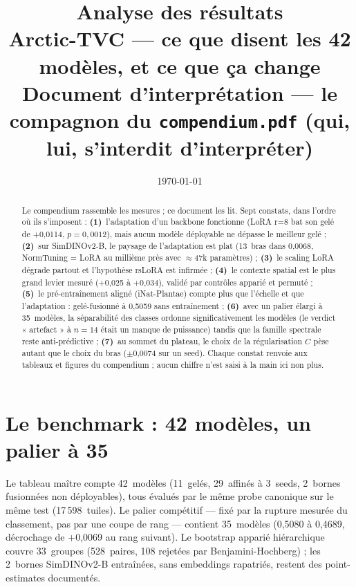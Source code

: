 \documentclass[10pt,a4paper]{article}
\title{\huge\textbf{Analyse des résultats}\\[4pt]
\large Arctic-TVC — ce que disent les 42 modèles, et ce que ça change\\[6pt]
\normalsize Document d'interprétation — le compagnon du \texttt{compendium.pdf}
(qui, lui, s'interdit d'interpréter)}
\date{\today}
\begin{document}
\maketitle

\begin{abstract}
\noindent Le compendium rassemble les mesures ; ce document les lit. Sept constats,
dans l'ordre où ils s'imposent :
\textbf{(1)}~l'adaptation d'un backbone fonctionne (LoRA r=8 bat son gelé de
+0,0114, $p=0{,}0012$), mais aucun modèle déployable ne dépasse le meilleur gelé ;
\textbf{(2)}~sur SimDINOv2-B, le paysage de l'adaptation est plat (13~bras dans
0,0068, NormTuning = LoRA au millième près avec $\approx$47k paramètres) ;
\textbf{(3)}~le scaling LoRA dégrade partout et l'hypothèse rsLoRA est infirmée ;
\textbf{(4)}~le contexte spatial est le plus grand levier mesuré (+0,025 à +0,034),
validé par contrôles apparié et permuté ;
\textbf{(5)}~le pré-entraînement aligné (iNat-Plantae) compte plus que l'échelle et
que l'adaptation : gelé-fusionné à 0,5059 sans entraînement ;
\textbf{(6)}~avec un palier élargi à 35~modèles, la séparabilité des classes ordonne
significativement les modèles (le verdict « artefact » à $n=14$ était un manque de
puissance) tandis que la famille spectrale reste anti-prédictive ;
\textbf{(7)}~au sommet du plateau, le choix de la régularisation $C$ pèse autant
que le choix du bras ($\pm$0,0074 sur un seed).
Chaque constat renvoie aux tableaux et figures du compendium ; aucun chiffre n'est
saisi à la main ici non plus.
\end{abstract}

\tableofcontents
\newpage

\section{Le benchmark : 42 modèles, un palier à 35}\label{ana:bench}

Le tableau maître compte 42~modèles (11~gelés, 29~affinés à 3~seeds, 2~bornes
fusionnées non déployables), tous évalués par le même probe canonique sur le même
test (17\,598~tuiles). Le palier compétitif — fixé par la rupture mesurée du
classement, pas par une coupe de rang — contient 35~modèles (0,5080 à 0,4689,
décrochage de +0,0069 au rang suivant). Le bootstrap apparié hiérarchique couvre
33~groupes (528~paires, 108 rejetées par Benjamini-Hochberg) ; les 2~bornes
SimDINOv2-B entraînées, sans embeddings rapatriés, restent des point-estimates
documentés.
\end{document}
